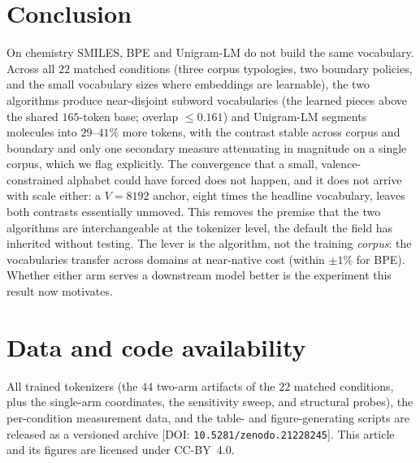 \documentclass{article}
\begin{document}
\section{Conclusion}\label{sec:conclusion}

On chemistry SMILES, BPE and Unigram-LM do not build the same vocabulary.
Across all $22$ matched conditions (three corpus typologies,
two boundary policies, and the small vocabulary sizes where embeddings are
learnable), the two algorithms produce near-disjoint subword vocabularies
(the learned pieces above the shared $165$-token base; overlap $\le 0.161$)
and Unigram-LM segments molecules into $29$--$41\%$
more tokens, with the contrast stable across corpus and boundary and only one
secondary measure attenuating in magnitude on a single corpus, which we flag
explicitly.
The convergence that a small, valence-constrained alphabet could have
forced does not happen, and it does not arrive with scale either: a $V{=}8192$
anchor, eight times the headline vocabulary, leaves both contrasts essentially
unmoved. This removes the premise that the two algorithms
are interchangeable at the tokenizer level, the default the field has
inherited without testing. The lever is the algorithm, not the training
\emph{corpus}: the vocabularies transfer across domains at near-native cost
(within $\pm 1\%$ for BPE). Whether either arm serves a downstream model
better is the experiment this result now motivates.

\section*{Data and code availability}

\begin{sloppypar}
All trained tokenizers (the $44$ two-arm artifacts of the $22$ matched
conditions, plus the single-arm coordinates, the sensitivity sweep, and
structural probes), the per-condition measurement
data, and the table- and
figure-generating scripts are released as a versioned archive
[DOI: \texttt{10.5281/zenodo.21228245}]. This article and its figures are
licensed under CC-BY~4.0.
\end{sloppypar}

\end{document}
